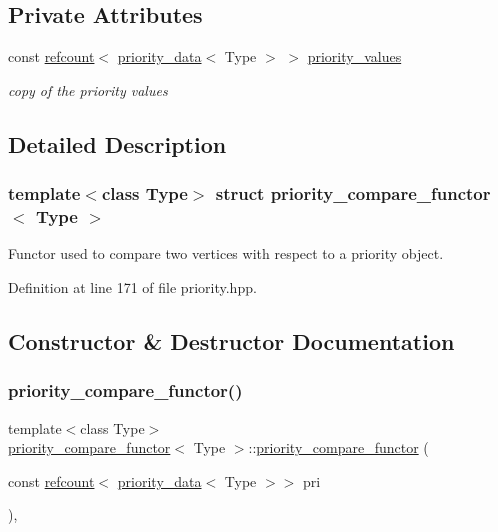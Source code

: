 \subsection*{Private Attributes}
\begin{DoxyCompactItemize}
\item 
const \hyperlink{structrefcount}{refcount}$<$ \hyperlink{structpriority__data}{priority\+\_\+data}$<$ Type $>$ $>$ \hyperlink{structpriority__compare__functor_acb4cba7f726af2a6da4250ae6d15e01f}{priority\+\_\+values}
\begin{DoxyCompactList}\small\item\em copy of the priority values \end{DoxyCompactList}\end{DoxyCompactItemize}


\subsection{Detailed Description}
\subsubsection*{template$<$class Type$>$\newline
struct priority\+\_\+compare\+\_\+functor$<$ Type $>$}

Functor used to compare two vertices with respect to a priority object. 

Definition at line 171 of file priority.\+hpp.



\subsection{Constructor \& Destructor Documentation}
\mbox{\label{structpriority__compare__functor_a3fe538f6182d30aafa148bcf5b3f9c57}} 
\subsubsection{\texorpdfstring{priority\+\_\+compare\+\_\+functor()}{priority\_compare\_functor()}\hspace{0.1cm}{\footnotesize\ttfamily [1/2]}}
{\footnotesize\ttfamily template$<$class Type$>$ \\
\hyperlink{structpriority__compare__functor}{priority\+\_\+compare\+\_\+functor}$<$ Type $>$\+::\hyperlink{structpriority__compare__functor}{priority\+\_\+compare\+\_\+functor} (\begin{DoxyParamCaption}\item[{const \hyperlink{structrefcount}{refcount}$<$ \hyperlink{structpriority__data}{priority\+\_\+data}$<$ Type $>$$>$}]{pri }\end{DoxyParamCaption})\hspace{0.3cm}{\ttfamily [inline]}, {\ttfamily [explicit]}}



